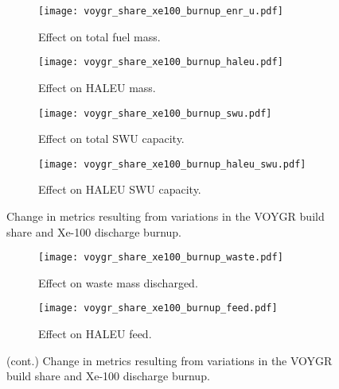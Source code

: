 \begin{figure}
    \begin{subfigure}[h!]{0.48\textwidth}
        \centering
        \texttt{[image: voygr\_share\_xe100\_burnup\_enr\_u.pdf]}
        \caption{Effect on total fuel mass.}
        \label{fig:voygr_share_xe100_burnup_enr_u}
    \end{subfigure}
    \hfill
    \begin{subfigure}[h!]{0.48\textwidth}
        \centering
        \texttt{[image: voygr\_share\_xe100\_burnup\_haleu.pdf]}
        \caption{Effect on HALEU mass.}
        \label{fig:voygr_share_xe100_burnup_haleu}
    \end{subfigure}  
    \begin{subfigure}[h!]{0.48\textwidth}
        \centering
        \texttt{[image: voygr\_share\_xe100\_burnup\_swu.pdf]}
        \caption{Effect on total SWU capacity.}
        \label{fig:voygr_share_xe100_burnup_swu}
    \end{subfigure}
    \hfill
    \begin{subfigure}[h!]{0.48\textwidth}
        \centering
        \texttt{[image: voygr\_share\_xe100\_burnup\_haleu\_swu.pdf]}
        \caption{Effect on HALEU SWU capacity.}
        \label{fig:voygr_share_xe100_burnup_haleu_swu}
    \end{subfigure}
    \caption{Change in metrics resulting from variations in the 
    VOYGR build share and Xe-100 discharge burnup.}
\end{figure}

\begin{figure}
    \ContinuedFloat      
    \begin{subfigure}[h!]{0.48\textwidth}
        \centering
        \texttt{[image: voygr\_share\_xe100\_burnup\_waste.pdf]}
        \caption{Effect on waste mass discharged.}
        \label{fig:voygr_share_xe100_burnup_waste}
    \end{subfigure}
    \hfill
    \begin{subfigure}[h!]{0.48\textwidth}
        \centering
        \texttt{[image: voygr\_share\_xe100\_burnup\_feed.pdf]}
        \caption{Effect on HALEU feed.}
        \label{fig:voygr_share_xe100_burnup_feed}
    \end{subfigure}
    \caption{(cont.) Change in metrics resulting from variations in the 
    VOYGR build share and Xe-100 discharge burnup.}
    \label{fig:voygr_share_xe100_burnup}
\end{figure}

